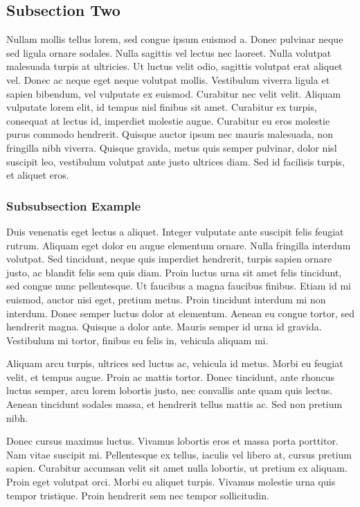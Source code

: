 \documentclass[a4paper]{LTJournalArticle}
\begin{document}
	\subsection{Subsection Two}
	
	Nullam mollis tellus lorem, sed congue ipsum euismod a. Donec pulvinar neque sed ligula ornare sodales. Nulla sagittis vel lectus nec laoreet. Nulla volutpat malesuada turpis at ultricies. Ut luctus velit odio, sagittis volutpat erat aliquet vel. Donec ac neque eget neque volutpat mollis. Vestibulum viverra ligula et sapien bibendum, vel vulputate ex euismod. Curabitur nec velit velit. Aliquam vulputate lorem elit, id tempus nisl finibus sit amet. Curabitur ex turpis, consequat at lectus id, imperdiet molestie augue. Curabitur eu eros molestie purus commodo hendrerit. Quisque auctor ipsum nec mauris malesuada, non fringilla nibh viverra. Quisque gravida, metus quis semper pulvinar, dolor nisl suscipit leo, vestibulum volutpat ante justo ultrices diam. Sed id facilisis turpis, et aliquet eros.
	
	\subsubsection{Subsubsection Example}
	
	Duis venenatis eget lectus a aliquet. Integer vulputate ante suscipit felis feugiat rutrum. Aliquam eget dolor eu augue elementum ornare. Nulla fringilla interdum volutpat. Sed tincidunt, neque quis imperdiet hendrerit, turpis sapien ornare justo, ac blandit felis sem quis diam. Proin luctus urna sit amet felis tincidunt, sed congue nunc pellentesque. Ut faucibus a magna faucibus finibus. Etiam id mi euismod, auctor nisi eget, pretium metus. Proin tincidunt interdum mi non interdum. Donec semper luctus dolor at elementum. Aenean eu congue tortor, sed hendrerit magna. Quisque a dolor ante. Mauris semper id urna id gravida. Vestibulum mi tortor, finibus eu felis in, vehicula aliquam mi.
	
	Aliquam arcu turpis, ultrices sed luctus ac, vehicula id metus. Morbi eu feugiat velit, et tempus augue. Proin ac mattis tortor. Donec tincidunt, ante rhoncus luctus semper, arcu lorem lobortis justo, nec convallis ante quam quis lectus. Aenean tincidunt sodales massa, et hendrerit tellus mattis ac. Sed non pretium nibh. 
	
	Donec cursus maximus luctus. Vivamus lobortis eros et massa porta porttitor. Nam vitae suscipit mi. Pellentesque ex tellus, iaculis vel libero at, cursus pretium sapien. Curabitur accumsan velit sit amet nulla lobortis, ut pretium ex aliquam. Proin eget volutpat orci. Morbi eu aliquet turpis. Vivamus molestie urna quis tempor tristique. Proin hendrerit sem nec tempor sollicitudin.
	
	
	\printbibliography %
	
	
\end{document}
